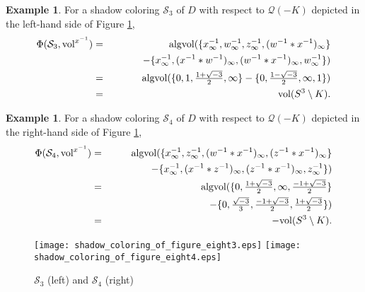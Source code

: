 \documentclass[12pt]{amsart}
\theoremstyle{definition}
\newtheorem{example}[theorem]{Example}
\begin{document}
\begin{example}
For a shadow coloring $\mathcal{S}_{3}$ of $D$ with respect to $\mathcal{Q}(-K)$ depicted in the left-hand side of Figure \ref{fig:shadow_coloring_of_figure_eight34},
\begin{eqnarray*}
 \Phi(\mathcal{S}_{3}, \mathrm{vol}^{x^{-1}}) & = & \mathrm{algvol}(\{ x^{-1}_{\infty}, w^{-1}_{\infty}, z^{-1}_{\infty}, (w^{-1} \ast x^{-1})_{\infty} \} \\
 & & \hskip 3em - \{ x^{-1}_{\infty}, (x^{-1} \ast w^{-1})_{\infty}, (w^{-1} \ast x^{-1})_{\infty}, w^{-1}_{\infty} \}) \\
 & = & \mathrm{algvol}(\{ 0, 1, \tfrac{1 + \sqrt{-3}}{2}, \infty \} - \{ 0, \tfrac{1 - \sqrt{-3}}{2}, \infty, 1 \}) \\
 & = & \mathrm{vol}(S^{3} \setminus K).
\end{eqnarray*}
\end{example}

\begin{example}
For a shadow coloring $\mathcal{S}_{4}$ of $D$ with respect to $\mathcal{Q}(-K)$ depicted in the right-hand side of Figure \ref{fig:shadow_coloring_of_figure_eight34},
\begin{eqnarray*}
 \Phi(\mathcal{S}_{4}, \mathrm{vol}^{x^{-1}}) & = & \mathrm{algvol}(\{ x^{-1}_{\infty}, z^{-1}_{\infty}, (w^{-1} \ast x^{-1})_{\infty}, (z^{-1} \ast x^{-1})_{\infty} \} \\
 & & \hskip 4em - \{ x^{-1}_{\infty}, (x^{-1} \ast z^{-1})_{\infty}, (z^{-1} \ast x^{-1})_{\infty}, z^{-1}_{\infty} \}) \\
 & = & \mathrm{algvol}(\{ 0, \tfrac{1 + \sqrt{-3}}{2}, \infty, \tfrac{-1 + \sqrt{-3}}{2} \} \\
 & & \hskip 4em - \{ 0, \tfrac{\sqrt{-3}}{3}, \tfrac{-1 + \sqrt{-3}}{2}, \tfrac{1 + \sqrt{-3}}{2} \}) \\
 & = & - \mathrm{vol}(S^{3} \setminus K).
\end{eqnarray*}
\end{example}

\begin{figure}[htb]
\begin{center}
\texttt{[image: shadow\_coloring\_of\_figure\_eight3.eps]} \qquad \qquad
\texttt{[image: shadow\_coloring\_of\_figure\_eight4.eps]}
\end{center}
\caption{$\mathcal{S}_{3}$ (left) and $\mathcal{S}_{4}$ (right)}
\label{fig:shadow_coloring_of_figure_eight34}
\end{figure}
\end{document}
